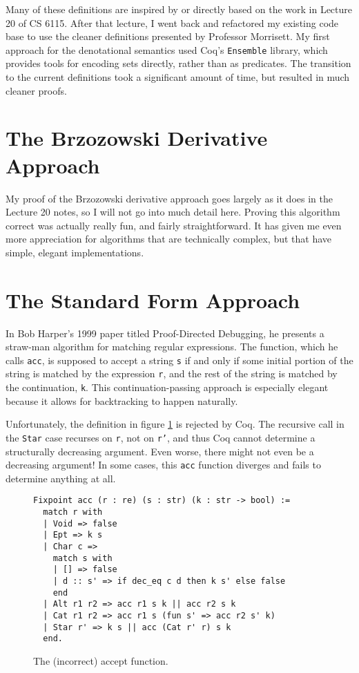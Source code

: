 \documentclass{article}
\newcommand{\coq}[1]{\texttt{#1}}
\begin{document}
Many of these definitions are inspired by or directly based on the work in
Lecture 20 of CS 6115. After that lecture, I went back and refactored my
existing code base to use the cleaner definitions presented by Professor
Morrisett. My first approach for the denotational semantics used Coq's
\coq{Ensemble} library, which provides tools for encoding sets directly, rather
than as predicates. The transition to the current definitions took a significant
amount of time, but resulted in much cleaner proofs.

\section{The Brzozowski Derivative Approach} \label{deriv}
My proof of the Brzozowski derivative approach goes largely as it does in the
Lecture 20 notes, so I will not go into much detail here. Proving this algorithm
correct was actually really fun, and fairly straightforward. It has given me
even more appreciation for algorithms that are technically complex, but that
have simple, elegant implementations.

\section{The Standard Form Approach} \label{standard}
In Bob Harper's 1999 paper titled Proof-Directed
Debugging,\cite{Harper:1999:PD:968578.968582} he presents a straw-man algorithm
for matching regular expressions. The function, which he calls \coq{acc}, is
supposed to accept a string \coq{s} if and only if some initial portion of the
string is matched by the expression \coq{r}, and the rest of the string is
matched by the continuation, \coq{k}. This continuation-passing approach is
especially elegant because it allows for backtracking to happen naturally.

Unfortunately, the definition in figure \ref{fig:acc} is rejected by Coq. The
recursive call in the \coq{Star} case recurses on \coq{r}, not on \coq{r'}, and
thus Coq cannot determine a structurally decreasing argument. Even worse, there
might not even be a decreasing argument! In some cases, this \coq{acc} function
diverges and fails to determine anything at all.

\begin{figure}
  \centering
\begin{verbatim}
Fixpoint acc (r : re) (s : str) (k : str -> bool) :=
  match r with
  | Void => false
  | Ept => k s
  | Char c =>
    match s with
    | [] => false
    | d :: s' => if dec_eq c d then k s' else false
    end
  | Alt r1 r2 => acc r1 s k || acc r2 s k
  | Cat r1 r2 => acc r1 s (fun s' => acc r2 s' k)
  | Star r' => k s || acc (Cat r' r) s k
  end.
\end{verbatim}
\caption{The (incorrect) accept function.}
\label{fig:acc}
\end{figure}
\end{document}

